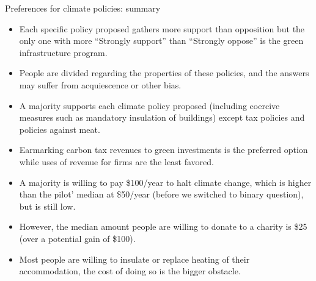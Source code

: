 \documentclass[aspectratio=169,9pt,dvipsnames]{beamer}
\begin{document}
\begin{frame}{Preferences for climate policies: summary}
    \begin{itemize}
        \item Each specific policy proposed gathers more support than opposition but the only one with more ``Strongly support'' than ``Strongly oppose'' is the green infrastructure program.
        \item People are divided regarding the properties of these policies, and the answers may suffer from acquiescence or other bias. %
        \item A majority supports each climate policy proposed (including coercive measures such as mandatory insulation of buildings) except tax policies and policies against meat. 
        \item Earmarking carbon tax revenues to green investments is the preferred option while uses of revenue for firms are the least favored.
        \item A majority is willing to pay \$100/year to halt climate change, which is higher than the pilot' median at \$50/year (before we switched to binary question), but is still low. 
        \item However, the median amount people are willing to donate to a charity is \$25 (over a potential gain of \$100). 
        \item Most people are willing to insulate or replace heating of their accommodation, the cost of doing so is the bigger obstacle.
        \end{itemize}
\end{frame}
\end{document}
